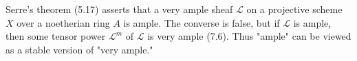Serre's theorem (5.17) asserts that a very ample sheaf $\mathcal{L}$ on a projective scheme $X$ over a noetherian ring $A$ is ample. The converse is false, but if $\mathcal{L}$ is ample, then some tensor power $\mathcal{L}^m$ of $\mathcal{L}$ is very ample (7.6). Thus "ample" can be viewed as a stable version of "very ample."
